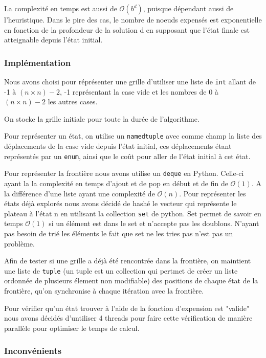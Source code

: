 \documentclass[a4paper, 12pt]{article}
\begin{document}
La complexité en temps est aussi de $\mathcal{O}(b^{d})$, puisque dépendant aussi de l'heuristique. Dans le pire des cas, le nombre de noeuds expensés est exponentielle en fonction de la profondeur de la solution d en supposant que l'état finale est atteignable depuis l'état initial.

\subsubsection{Implémentation}

Nous avons choisi pour réprésenter une grille d'utiliser une liste de \lstinline{int} allant de -1 à $(n \times n) - 2$, -1 représentant la case vide et les nombres de 0 à $(n \times n) - 2$ les autres cases.

On stocke la grille initiale pour toute la durée de l'algorithme.

Pour représenter un état, on utilise un \lstinline{namedtuple} avec comme champ la liste des déplacements de la case vide depuis l'état initial, ces déplacements étant représentés par un \lstinline{enum}, ainsi que le coût pour aller de l'état initial à cet état.

Pour représenter la frontière nous avons utilise un \lstinline{deque} en Python. Celle-ci ayant la la complexité en temps d'ajout et de pop en début et de fin de $\mathcal{O}(1)$. A la différence d'une liste ayant une complexité de $\mathcal{O}(n)$.
    Pour représenter les états déjà explorés nous avons décidé de hashé le vecteur qui représente le plateau à l'état n en utilisant la collection \lstinline{set} de python. Set permet de savoir en temps $\mathcal{O}(1)$ si un élément est dans le set et n'accepte pas les doublons. N'ayant pas besoin de trié les éléments le fait que set ne les tries pas n'est pas un problème.


Afin de tester si une grille a déjà été rencontrée dans la frontière, on maintient une liste de \lstinline{tuple} (un tuple est un collection qui pertmet de créer un liste ordonnée de plusieurs élement non modifiable) des positions de chaque état de la frontière, qu'on synchronise à chaque itération avec la frontière.


Pour vérifier qu'un état trouver à l'aide de la fonction d'expension est "valide" nous avons décidés d'untiliser 4 threads pour faire cette vérification de manière parallèle pour optimiser le temps de calcul.

\subsubsection{Inconvénients}
\end{document}

